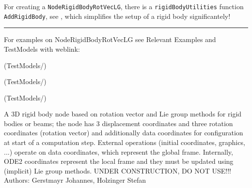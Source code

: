     For creating a \texttt{NodeRigidBodyRotVecLG}, there is a \texttt{rigidBodyUtilities} function \texttt{AddRigidBody}, 
    see , which simplifies the setup of a rigid body significantely!
\vspace{6pt}\par\noindent\rule{\textwidth}{0.4pt}
%
\noindent For examples on NodeRigidBodyRotVecLG see Relevant Examples and TestModels with weblink:
\bi
\item {} (TestModels/)
\item {} (TestModels/)
\item {} (TestModels/)

\ei

%
\newpage


\label{sec:item:NodeRigidBodyRotVecDataLG}
A 3D rigid body node based on rotation vector and Lie group methods for rigid bodies or beams; the node has 3 displacement coordinates and three rotation coordinates (rotation vector) and additionally data coordinates for configuration at start of a computation step. External operations (initial coordinates, graphics, ...) operate on data coordinates, which represent the global frame. Internally, ODE2 coordinates represent the local frame and they must be updated using (implicit) Lie group methods. UNDER CONSTRUCTION, DO NOT USE!!!
\vspace{12pt}\\

\noindent Authors: Gerstmayr Johannes, Holzinger Stefan
\vspace{12pt}\\

